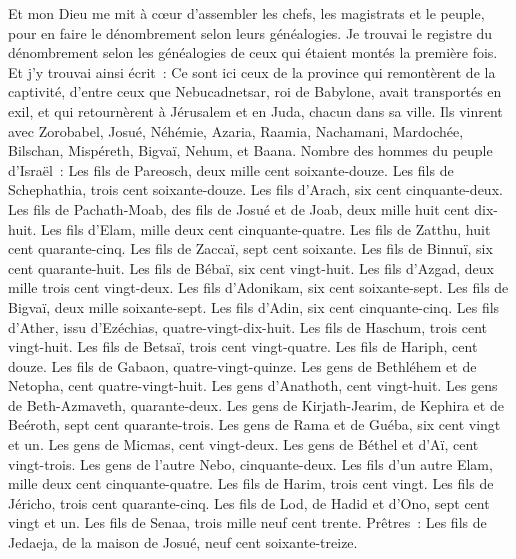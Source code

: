 \begin{multicols}{2}
Et mon Dieu me mit à cœur d'assembler les chefs, les magistrats et le peuple, pour en faire le dénombrement selon leurs généalogies. Je trouvai le registre du dénombrement selon les généalogies de ceux qui étaient montés la première fois. Et j'y trouvai ainsi écrit~:
Ce sont ici ceux de la province qui remontèrent de la captivité, d'entre ceux que Nebucadnetsar, roi de Babylone, avait transportés en exil, et qui retournèrent à Jérusalem et en Juda, chacun dans sa ville.
Ils vinrent avec Zorobabel, Josué, Néhémie, Azaria, Raamia, Nachamani, Mardochée, Bilschan, Mispéreth, Bigvaï, Nehum, et Baana. Nombre des hommes du peuple d'Israël~:
Les fils de Pareosch, deux mille cent soixante-douze.
Les fils de Schephathia, trois cent soixante-douze.
Les fils d'Arach, six cent cinquante-deux.
Les fils de Pachath-Moab, des fils de Josué et de Joab, deux mille huit cent dix-huit.
Les fils d'Elam, mille deux cent cinquante-quatre.
Les fils de Zatthu, huit cent quarante-cinq.
Les fils de Zaccaï, sept cent soixante.
Les fils de Binnuï, six cent quarante-huit.
Les fils de Bébaï, six cent vingt-huit.
Les fils d'Azgad, deux mille trois cent vingt-deux.
Les fils d'Adonikam, six cent soixante-sept.
Les fils de Bigvaï, deux mille soixante-sept.
Les fils d'Adin, six cent cinquante-cinq.
Les fils d'Ather, issu d'Ezéchias, quatre-vingt-dix-huit.
Les fils de Haschum, trois cent vingt-huit.
Les fils de Betsaï, trois cent vingt-quatre.
Les fils de Hariph, cent douze.
Les fils de Gabaon, quatre-vingt-quinze.
Les gens de Bethléhem et de Netopha, cent quatre-vingt-huit.
Les gens d'Anathoth, cent vingt-huit.
Les gens de Beth-Azmaveth, quarante-deux.
Les gens de Kirjath-Jearim, de Kephira et de Beéroth, sept cent quarante-trois.
Les gens de Rama et de Guéba, six cent vingt et un.
Les gens de Micmas, cent vingt-deux.
Les gens de Béthel et d'Aï, cent vingt-trois.
Les gens de l'autre Nebo, cinquante-deux.
Les fils d'un autre Elam, mille deux cent cinquante-quatre.
Les fils de Harim, trois cent vingt.
Les fils de Jéricho, trois cent quarante-cinq.
Les fils de Lod, de Hadid et d'Ono, sept cent vingt et un.
Les fils de Senaa, trois mille neuf cent trente.
Prêtres~: Les fils de Jedaeja, de la maison de Josué, neuf cent soixante-treize.

\end{multicols}
